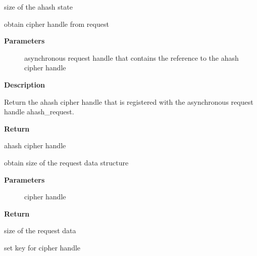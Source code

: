 \documentclass[a4paper,8pt,english]{sphinxmanual}
\begin{document}
size of the ahash state

\begin{fulllineitems}
\label{crypto/api-digest:c.crypto_ahash_reqtfm}
obtain cipher handle from request

\end{fulllineitems}


\textbf{Parameters}
\begin{description}
\item[{}] \leavevmode
asynchronous request handle that contains the reference to the ahash
cipher handle

\end{description}

\textbf{Description}

Return the ahash cipher handle that is registered with the asynchronous
request handle ahash\_request.

\textbf{Return}

ahash cipher handle

\begin{fulllineitems}
\label{crypto/api-digest:c.crypto_ahash_reqsize}
obtain size of the request data structure

\end{fulllineitems}


\textbf{Parameters}
\begin{description}
\item[{}] \leavevmode
cipher handle

\end{description}

\textbf{Return}

size of the request data

\begin{fulllineitems}
\label{crypto/api-digest:c.crypto_ahash_setkey}
set key for cipher handle

\end{fulllineitems}
\end{document}
